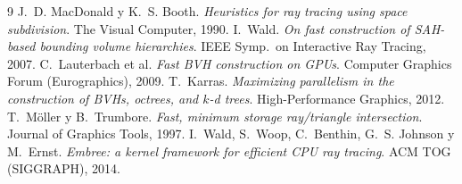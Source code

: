 \documentclass[10pt]{article}
\begin{document}
\begin{thebibliography}{9}\footnotesize\setlength{\itemsep}{0pt}
 J.~D. MacDonald y K.~S. Booth. \emph{Heuristics for ray
tracing using space subdivision}. The Visual Computer, 1990.
 I.~Wald. \emph{On fast construction of SAH-based bounding volume
hierarchies}. IEEE Symp.\ on Interactive Ray Tracing, 2007.
 C.~Lauterbach et al. \emph{Fast BVH construction on GPUs}.
Computer Graphics Forum (Eurographics), 2009.
 T.~Karras. \emph{Maximizing parallelism in the construction of
BVHs, octrees, and $k$-d trees}. High-Performance Graphics, 2012.
 T.~Möller y B.~Trumbore. \emph{Fast, minimum storage
ray/triangle intersection}. Journal of Graphics Tools, 1997.
 I.~Wald, S.~Woop, C.~Benthin, G.~S. Johnson y M.~Ernst.
\emph{Embree: a kernel framework for efficient CPU ray tracing}. ACM TOG
(SIGGRAPH), 2014.
\end{thebibliography}
\end{document}
